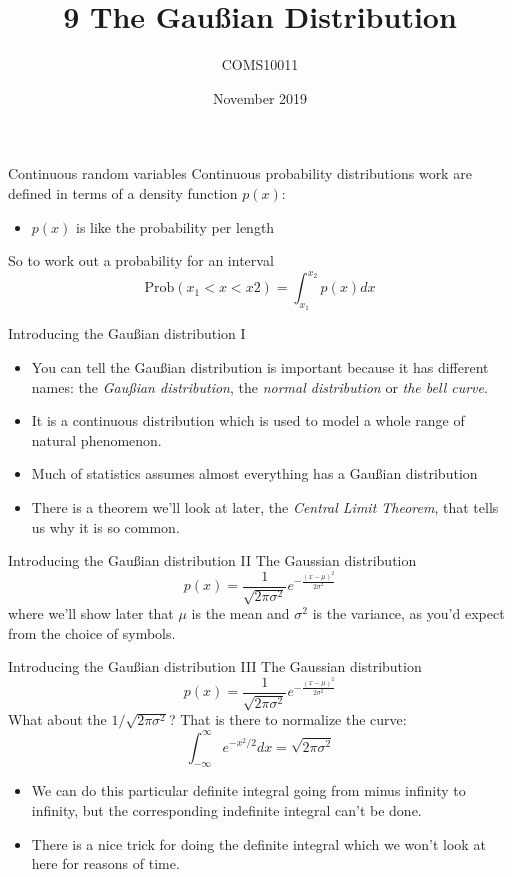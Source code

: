 \documentclass{beamer}
\title[9 The Gau\ss{}ian Distribution]{9 The Gau\ss{}ian Distribution}
\author{COMS10011}
\institute{\texttt{coms10011.github.io}}
\date{November 2019}
\begin{document}
\maketitle



\begin{frame}{Continuous random variables}
\color{black}
Continuous probability distributions work are defined
in terms of a density function \color{reddish}$p(x)$\color{black}:
\begin{itemize}
\item \color{reddish}$p(x)$\color{black} is like the probability per length
\end{itemize}
So to work out a probability for an interval
\color{reddish}
$$
\mbox{Prob}(x_1<x<x2)=\int_{x_1}^{x_2} p(x)dx
$$
\color{black}
\end{frame}

\begin{frame}{Introducing the Gau\ss{}ian distribution I}
\color{black}
\begin{itemize}
\item You can tell the Gau\ss{}ian distribution is important because it has different names: the \textsl{Gau\ss{}ian distribution}, the \textsl{normal distribution} or \textsl{the bell curve}.
\item It is a continuous distribution which is used to model a whole range of
natural phenomenon.
\item Much of statistics assumes almost everything has a Gau\ss{}ian distribution
\item There is a theorem we'll look at later, the \textsl{Central Limit Theorem}, that tells us why it is so common.
\end{itemize}
\end{frame}



\begin{frame}{Introducing the Gau\ss{}ian distribution II}
The Gaussian distribution
\color{purple}
$$
p(x)=\frac{1}{\sqrt{2\pi\sigma^2}}e^{-\frac{(x-\mu)^2}{2\sigma^2}}
$$
\color{black} where we'll show later that
\color{reddish}$\mu$\color{black}{} is the mean and
\color{reddish}$\sigma^2$\color{black}{}  is the variance, as you'd
expect from the choice of symbols.
\end{frame}

\begin{frame}{Introducing the Gau\ss{}ian distribution III}
The Gaussian distribution
\color{reddish}
$$
p(x)=\frac{1}{\sqrt{2\pi\sigma^2}}e^{-\frac{(x-\mu)^2}{2\sigma^2}}
$$
\color{black}
What about the \color{reddish}$1/\sqrt{2\pi\sigma^2}$\color{black}{}? That is there to normalize the curve:
\color{purple}
$$
\int_{-\infty}^\infty e^{-x^2/2}dx=\sqrt{2\pi\sigma^2}
$$
\color{black}
\begin{itemize}
\item We can do this particular definite integral
going from minus infinity to infinity, but the corresponding
indefinite integral can't be done.
\item There is a nice trick for doing the definite integral which we won't
  look at here for reasons of time.
\end{itemize}
\end{frame}
\end{document}
